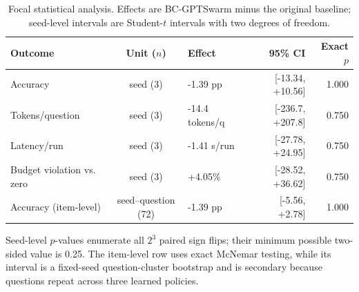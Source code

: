 \begin{table}[t]
\centering
\caption{Focal statistical analysis. Effects are BC-GPTSwarm minus the original baseline; seed-level intervals are Student-$t$ intervals with two degrees of freedom.}
\label{tab:statistical-results}
\small
\setlength{\tabcolsep}{4pt}
\begin{tabular}{lclrr}
\hline
Outcome & Unit ($n$) & Effect & 95\% CI & Exact $p$ \\
\hline
Accuracy & seed (3) & -1.39 pp & [-13.34, +10.56] & 1.000 \\
Tokens/question & seed (3) & -14.4 tokens/q & [-236.7, +207.8] & 0.750 \\
Latency/run & seed (3) & -1.41 s/run & [-27.78, +24.95] & 0.750 \\
Budget violation vs. zero & seed (3) & +4.05\% & [-28.52, +36.62] & 0.750 \\
Accuracy (item-level) & seed--question (72) & -1.39 pp & [-5.56, +2.78] & 1.000 \\
\hline
\end{tabular}
\begin{minipage}{0.96\textwidth}\footnotesize
Seed-level $p$-values enumerate all $2^3$ paired sign flips; their minimum possible two-sided value is 0.25. The item-level row uses exact McNemar testing, while its interval is a fixed-seed question-cluster bootstrap and is secondary because questions repeat across three learned policies.
\end{minipage}
\end{table}
